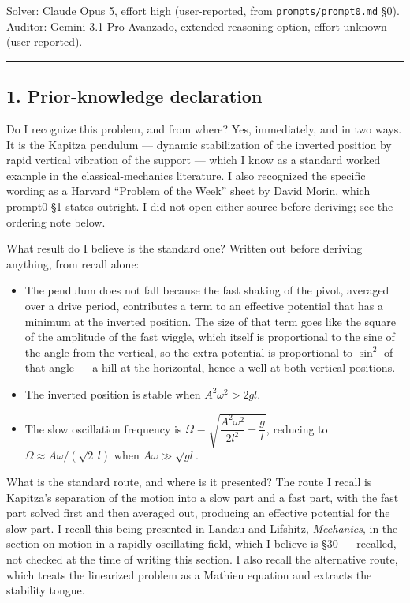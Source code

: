 \documentclass[11pt,a4paper]{article}
\providecommand{\passthrough}[1]{#1}
\providecommand{\tightlist}{\setlength{\itemsep}{0pt}\setlength{\parskip}{0pt}}
\begin{document}
Solver: Claude Opus 5, effort high (user-reported, from \passthrough{\lstinline!prompts/prompt0.md!} §0).
Auditor: Gemini 3.1 Pro Avanzado, extended-reasoning option, effort unknown
(user-reported).

\begin{center}\rule{0.5\linewidth}{0.5pt}\end{center}

\hypertarget{prior-knowledge-declaration}{%
\subsection{1. Prior-knowledge declaration}\label{prior-knowledge-declaration}}

Do I recognize this problem, and from where? Yes, immediately, and in two
ways. It is the Kapitza pendulum --- dynamic stabilization of the inverted
position by rapid vertical vibration of the support --- which I know as a standard
worked example in the classical-mechanics literature. I also recognized the
specific wording as a Harvard ``Problem of the Week'' sheet by David Morin, which
prompt0 §1 states outright. I did not open either source before deriving; see
the ordering note below.

What result do I believe is the standard one? Written out before deriving
anything, from recall alone:

\begin{itemize}
\tightlist
\item
  The pendulum does not fall because the fast shaking of the pivot, averaged
  over a drive period, contributes a term to an effective potential that has a
  minimum at the inverted position. The size of that term goes like the square
  of the amplitude of the fast wiggle, which itself is proportional to the sine
  of the angle from the vertical, so the extra potential is proportional to
  \(\sin^2\) of that angle --- a hill at the horizontal, hence a well at both
  vertical positions.
\item
  The inverted position is stable when \(A^2\omega^2 > 2gl\).
\item
  The slow oscillation frequency is
  \(\Omega=\sqrt{\dfrac{A^2\omega^2}{2l^2}-\dfrac{g}{l}}\), reducing to
  \(\Omega\approx A\omega/(\sqrt2\,l)\) when \(A\omega\gg\sqrt{gl}\).
\end{itemize}

What is the standard route, and where is it presented? The route I recall is
Kapitza's separation of the motion into a slow part and a fast part, with the
fast part solved first and then averaged out, producing an effective potential
for the slow part. I recall this being presented in Landau and Lifshitz,
\textit{Mechanics}, in the section on motion in a rapidly oscillating field, which I
believe is §30 --- recalled, not checked at the time of writing this section. I
also recall the alternative route, which treats the linearized problem as a
Mathieu equation and extracts the stability tongue.
\end{document}
